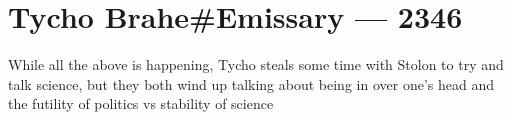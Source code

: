 \hypertarget{tycho-braheemissary-2346}{%
\chapter{Tycho Brahe\#Emissary — 2346}\label{tycho-braheemissary-2346}}

While all the above is happening, Tycho steals some time with Stolon to try and talk science, but they both wind up talking about being in over one's head and the futility of politics vs stability of science
